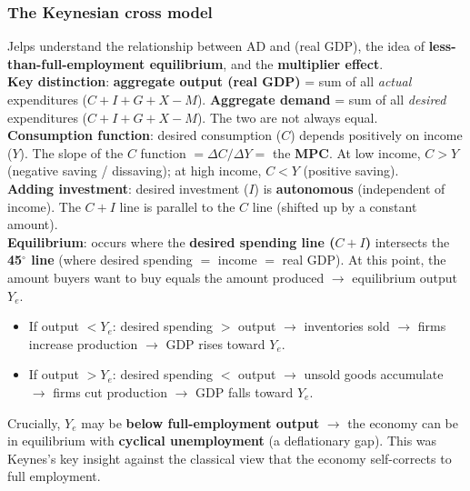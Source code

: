\documentclass[a4paper,12pt]{article}
\begin{document}
\subsubsection*{The Keynesian cross model}
Jelps understand the relationship between AD and (real GDP), the idea of \textbf{less-than-full-employment equilibrium}, and the \textbf{multiplier effect}.
\\
\textbf{Key distinction}: \textbf{aggregate output (real GDP)} = sum of all \textit{actual} expenditures ($C + I + G + X - M$). \textbf{Aggregate demand} = sum of all \textit{desired} expenditures ($C + I + G + X - M$). The two are not always equal.
\\
\textbf{Consumption function}: desired consumption ($C$) depends positively on income ($Y$). The slope of the $C$ function $= \Delta C / \Delta Y =$ the \textbf{MPC}. At low income, $C > Y$ (negative saving / dissaving); at high income, $C < Y$ (positive saving).
\\
\textbf{Adding investment}: desired investment ($I$) is \textbf{autonomous} (independent of income). The $C + I$ line is parallel to the $C$ line (shifted up by a constant amount).
\\
\textbf{Equilibrium}: occurs where the \textbf{desired spending line ($C + I$)} intersects the \textbf{45$^\circ$ line} (where desired spending $=$ income $=$ real GDP). At this point, the amount buyers want to buy equals the amount produced $\to$ equilibrium output $Y_e$.
\begin{itemize}
  \item If output $< Y_e$: desired spending $>$ output $\to$ inventories sold $\to$ firms increase production $\to$ GDP rises toward $Y_e$.
  \item If output $> Y_e$: desired spending $<$ output $\to$ unsold goods accumulate $\to$ firms cut production $\to$ GDP falls toward $Y_e$.
\end{itemize}
Crucially, $Y_e$ may be \textbf{below full-employment output} $\to$ the economy can be in equilibrium with \textbf{cyclical unemployment} (a deflationary gap). This was Keynes's key insight against the classical view that the economy self-corrects to full employment.
\\
\end{document}
